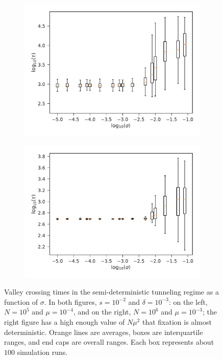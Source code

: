 \documentclass[10pt,twocolumn,twoside]{gsajnl}
\begin{document}
\begin{spacing}{1.5}
\iffalse
\begin{figure}[t]
\begin{subfigure}[b]{0.4\textwidth}
\includegraphics[width=\textwidth]{Figures/det_tunnel.pdf}
\end{subfigure}
\begin{subfigure}[b]{0.4\textwidth}
\includegraphics[width=\textwidth]{Figures/det_fix.pdf}
\end{subfigure}
\caption{Valley crossing times in the semi-deterministic tunneling regime as a function of $\sigma$. In both figures, $s = 10^{-2}$ and $\delta = 10^{-3}$: on the left, $N = 10^5$ and $\mu = 10^{-4}$, and on the right, $N = 10^6$ and $\mu = 10^{-3}$; the right figure has a high enough value of $N\mu^2$ that fixation is almost deterministic. Orange lines are averages, boxes are interquartile ranges, and end caps are overall ranges. Each box represents about $100$ simulation runs.}
\label{fig:deterministic}
\end{figure}


\end{spacing}
\end{document}
